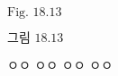 






























\begin{problembox}{}
$\text{Fig. 18.13}$

\end{problembox}

\begin{problembox}{}
$\text{그림 18.13}$

\end{problembox}

\begin{solbox}{}
\bnset
{}

 \zz

\bn \zzz

\bnset
{}
\bn \zzz

\bnset
{}
\bn \zzz

 ㅇㅇ \zzz
{} ㅇㅇ \zzz
{} ㅇㅇ \zzz
{} ㅇㅇ
\end{solbox}
\clearpage






